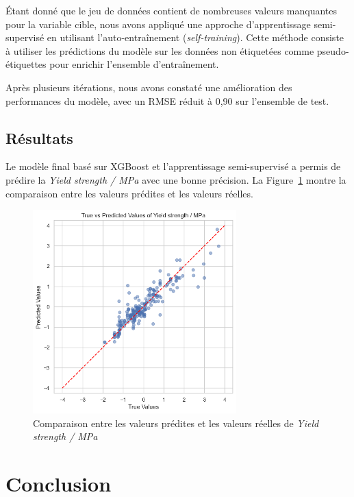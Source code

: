\documentclass{article}
\begin{document}
Étant donné que le jeu de données contient de nombreuses valeurs manquantes pour la variable cible, nous avons appliqué une approche d'apprentissage semi-supervisé en utilisant l'auto-entraînement (\textit{self-training}). Cette méthode consiste à utiliser les prédictions du modèle sur les données non étiquetées comme pseudo-étiquettes pour enrichir l'ensemble d'entraînement.

Après plusieurs itérations, nous avons constaté une amélioration des performances du modèle, avec un RMSE réduit à 0,90 sur l'ensemble de test.

\subsection{Résultats}

Le modèle final basé sur XGBoost et l'apprentissage semi-supervisé a permis de prédire la \textit{Yield strength / MPa} avec une bonne précision. La Figure~\ref{fig:predictions_vs_true} montre la comparaison entre les valeurs prédites et les valeurs réelles.

\begin{figure}[H]
    \centering
    \includegraphics[width=0.7\textwidth]{images/predictions_vs_true.png}
    \caption{Comparaison entre les valeurs prédites et les valeurs réelles de \textit{Yield strength / MPa}}
    \label{fig:predictions_vs_true}
\end{figure}

\section{Conclusion}
\end{document}
